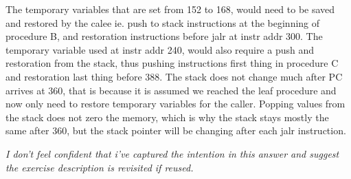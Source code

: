 The temporary variables that are set from 152 to 168, would need to be saved and restored by the calee ie. push to stack instructions at the beginning of procedure B, and restoration instructions before jalr at instr addr 300.
The temporary variable used at instr addr 240, would also require a push and restoration from the stack, thus pushing instructions first thing in procedure C and restoration last thing before 388.
The stack does not change much after PC arrives at 360, that is because it is assumed we reached the leaf procedure and now only need to restore temporary variables for the caller.
Popping values from the stack does not zero the memory, which is why the stack stays mostly the same after 360, but the stack pointer will be changing after each jalr instruction. 


\textit{I don't feel confident that i've captured the intention in this answer and suggest the exercise description is revisited if reused.}